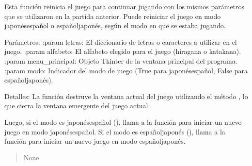 \documentclass[letterpaper,10pt,spanish]{sphinxmanual}
\begin{document}
\begin{fulllineitems}
\begin{fulllineitems}
\sphinxAtStartPar
Esta función reinicia el juego para continuar jugando con los mismos parámetros que
se utilizaron en la partida anterior. Puede reiniciar el juego en modo japonés\sphinxhyphen{}español
o español\sphinxhyphen{}japonés, según el modo en que se estaba jugando.

\sphinxAtStartPar
Parámetros:
:param letras: El diccionario de letras o caracteres a utilizar en el juego.
:param alfabeto: El alfabeto elegido para el juego (hiragana o katakana).
:param menu\_principal: Objeto Tkinter de la ventana principal del programa.
:param modo: Indicador del modo de juego (True para japonés\sphinxhyphen{}español, False para español\sphinxhyphen{}japonés).

\sphinxAtStartPar
Detalles:
La función destruye la ventana actual del juego utilizando el método , lo que
cierra la ventana emergente del juego actual.

\sphinxAtStartPar
Luego, si el modo es japonés\sphinxhyphen{}español (), llama a la función  para
iniciar un nuevo juego en modo japonés\sphinxhyphen{}español. Si el modo es español\sphinxhyphen{}japonés (),
llama a la función  para iniciar un nuevo juego en modo español\sphinxhyphen{}japonés.
\begin{quote}\begin{description}
\sphinxAtStartPar
None

\end{description}\end{quote}

\end{fulllineitems}


\end{fulllineitems}

\end{document}
